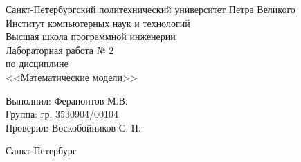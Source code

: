 \begin{titlepage}	%

	\begin{center}		%

		\large Санкт-Петербургский политехнический университет Петра Великого\\
		\large Институт компьютерных наук и технологий\\
		\large Высшая школа программной инженерии \\[6cm]

    \huge Лабораторная работа № 2\\[0.5cm] %
		\large по дисциплине\\[0.1cm]
		\large <<Математические модели>>

	\end{center}

		\noindent\large Выполнил: \hfill \large Ферапонтов М.В.\\
		\noindent\large Группа: \hfill \large гр. 3530904/00104\\

		\noindent\large Проверил: \hfill \large Воскобойников С. П.

	\vfill %

	\begin{center}
	\large Санкт-Петербург\\
	\large \the\year %
	\end{center} %

\end{titlepage} %

\vfill %
